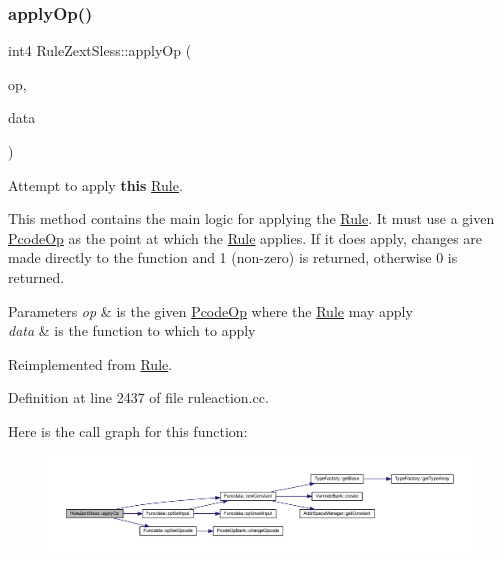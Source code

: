 \subsubsection{\texorpdfstring{applyOp()}{applyOp()}}
{\footnotesize\ttfamily int4 Rule\+Zext\+Sless\+::apply\+Op (\begin{DoxyParamCaption}\item[{\mbox{\hyperlink{class_pcode_op}{Pcode\+Op}} $\ast$}]{op,  }\item[{\mbox{\hyperlink{class_funcdata}{Funcdata}} \&}]{data }\end{DoxyParamCaption})\hspace{0.3cm}{\ttfamily [virtual]}}



Attempt to apply {\bfseries{this}} \mbox{\hyperlink{class_rule}{Rule}}. 

This method contains the main logic for applying the \mbox{\hyperlink{class_rule}{Rule}}. It must use a given \mbox{\hyperlink{class_pcode_op}{Pcode\+Op}} as the point at which the \mbox{\hyperlink{class_rule}{Rule}} applies. If it does apply, changes are made directly to the function and 1 (non-\/zero) is returned, otherwise 0 is returned. 
\begin{DoxyParams}{Parameters}
{\em op} & is the given \mbox{\hyperlink{class_pcode_op}{Pcode\+Op}} where the \mbox{\hyperlink{class_rule}{Rule}} may apply \\
\hline
{\em data} & is the function to which to apply \\
\hline
\end{DoxyParams}


Reimplemented from \mbox{\hyperlink{class_rule_a4e3e61f066670175009f60fb9dc60848}{Rule}}.



Definition at line 2437 of file ruleaction.\+cc.

Here is the call graph for this function\+:
\nopagebreak
\begin{figure}[H]
\begin{center}
\leavevmode
\includegraphics[width=350pt]{class_rule_zext_sless_ab27ad1b45b037db695c660850954f04e_cgraph}
\end{center}
\end{figure}
\mbox{\label{class_rule_zext_sless_aa1da647b42694b95d5caa0764a1964db}} 
